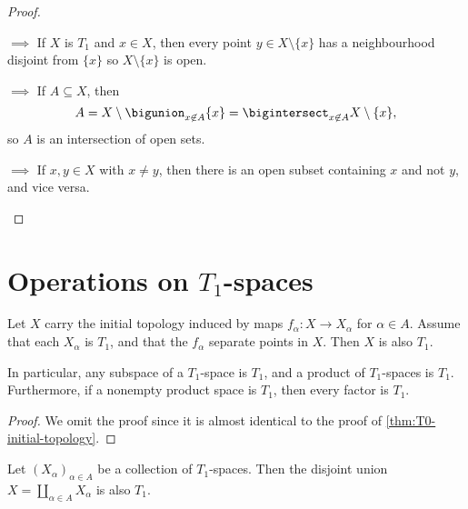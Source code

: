 \documentclass[article, a4paper, 11pt, oneside]{memoir}
\numberwithin{equation}{chapter}
\begin{document}
\begin{proof}
\begin{proofsec}
    \item[\subcref{enum:T1-space} $\implies$ \subcref{enum:T1-singletons-closed}]
    If $X$ is $T_1$ and $x \in X$, then every point $y \in X \setminus \{x\}$ has a neighbourhood disjoint from $\{x\}$ so $X \setminus \{x\}$ is open.

    \item[\subcref{enum:T1-singletons-closed} $\implies$ \subcref{enum:T1-intersection-of-open-sets}]
    If $A \subseteq X$, then
    \begin{equation*}
        A   = X \setminus \bigunion_{x \not\in A} \{x\}
            = \bigintersect_{x \not\in A} X \setminus \{x\},
    \end{equation*}
    so $A$ is an intersection of open sets.

    \item[\subcref{enum:T1-intersection-of-open-sets} $\implies$ \subcref{enum:T1-space}]
    If $x,y \in X$ with $x \neq y$, then there is an open subset containing $x$ and not $y$, and vice versa.
\end{proofsec}
\end{proof}


\section[Operations on T1-spaces][Operations on $T_1$-spaces]{Operations on $T_1$-spaces}

\begin{proposition}
    \label{thm:T1-initial-topology}
    Let $X$ carry the initial topology induced by maps $f_\alpha \colon X \to X_\alpha$ for $\alpha \in A$. Assume that each $X_\alpha$ is $T_1$, and that the $f_\alpha$ separate points in $X$. Then $X$ is also $T_1$.

    In particular, any subspace of a $T_1$-space is $T_1$, and a product of $T_1$-spaces is $T_1$. Furthermore, if a nonempty product space is $T_1$, then every factor is $T_1$.
\end{proposition}

\begin{proof}
    We omit the proof since it is almost identical to the proof of \cref{thm:T0-initial-topology}.
\end{proof}


\begin{proposition}
    Let $(X_\alpha)_{\alpha \in A}$ be a collection of $T_1$-spaces. Then the disjoint union $X = \coprod_{\alpha \in A} X_\alpha$ is also $T_1$.
\end{proposition}
\end{document}
